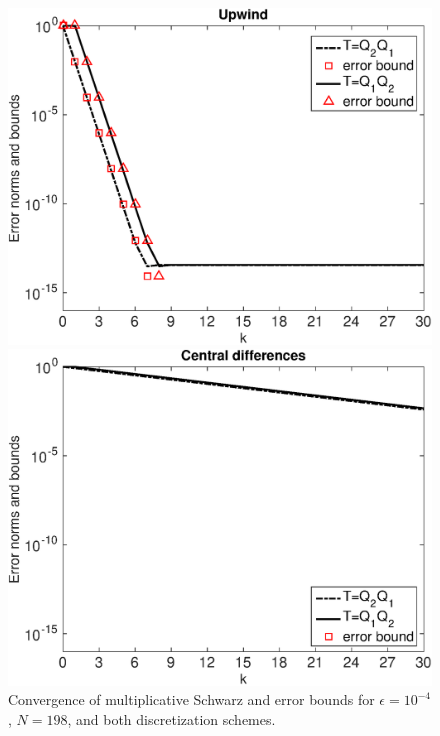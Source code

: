 \begin{figure}[tbhp]
\begin{minipage}[t]{0.49\linewidth}
\includegraphics[width=0.95\linewidth]{figures/mSm_upwind_eps_1e-04_N_198}
\end{minipage}
%
\begin{minipage}[t]{0.49\linewidth}
\includegraphics[width=0.95\linewidth]{figures/mSm_central_eps_1e-04_N_198}
\end{minipage}
\caption{Convergence of multiplicative Schwarz and error bounds for
$\epsilon=10^{-4}$, $N=198$, and both discretization schemes.}
\label{fig:1D:MSM.N198.eps4}
\end{figure}


